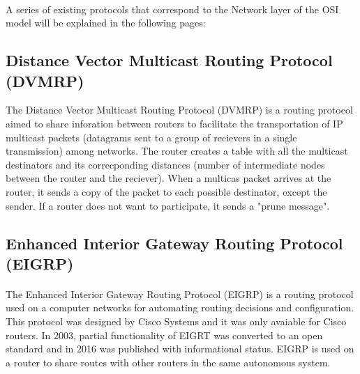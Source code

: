 \documentclass[12pt,a4paper]{report}
\begin{document}
\paragraph{}A series of existing protocols that correspond to the Network layer of the OSI model will be explained in the following pages:

\subsection{Distance Vector Multicast Routing Protocol (DVMRP)}
The Distance Vector Multicast Routing Protocol (DVMRP) is a routing protocol aimed to share inforation between routers to facilitate the transportation of IP multicast packets (datagrams sent to a group of recievers in a single transmission) among networks. The router creates a table with all the multicast destinators and its correcponding distances (number of intermediate nodes between the router and the reciever). When a multicas packet arrives at the router, it sends a copy of the packet to each possible destinator, except the sender. If a router does not want to participate, it sends a "prune message".

\subsection{Enhanced Interior Gateway Routing Protocol (EIGRP)}
\paragraph{}The Enhanced Interior Gateway Routing Protocol (EIGRP) is a routing protocol used on a computer networks for automating routing decisions and configuration. This protocol was designed by Cisco Systems and it was only avaiable for Cisco routers. In 2003, partial functionality of EIGRT was converted to an open standard and in 2016 was published with informational status. EIGRP is used on a router to share routes with other routers in the same autonomous system.
\end{document}
